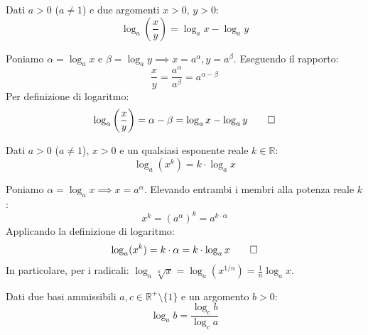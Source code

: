 \documentclass[11pt,a4paper,oneside]{report}
\begin{document}
\begin{teorema}
Dati $a > 0$ ($a \neq 1$) e due argomenti $x > 0$, $y > 0$:
\begin{equation}
    \log_a \left(\frac{x}{y}\right) = \log_a x - \log_a y
\end{equation}
\end{teorema}

\begin{dimostrazione}
Poniamo $\alpha = \log_a x$ e $\beta = \log_a y \implies x = a^\alpha, y = a^\beta$.
Eseguendo il rapporto:
\begin{equation}
    \frac{x}{y} = \frac{a^\alpha}{a^\beta} = a^{\alpha - \beta}
\end{equation}
Per definizione di logaritmo:
\begin{equation}
    \log_a \left(\frac{x}{y}\right) = \alpha - \beta = \log_a x - \log_a y \qedhere
\end{equation}
\end{dimostrazione}

\begin{teorema}
Dati $a > 0$ ($a \neq 1$), $x > 0$ e un qualsiasi esponente reale $k \in \mathbb{R}$:
\begin{equation}
    \log_a (x^k) = k \cdot \log_a x
\end{equation}
\end{teorema}

\begin{dimostrazione}
Poniamo $\alpha = \log_a x \implies x = a^\alpha$.
Elevando entrambi i membri alla potenza reale $k$:
\begin{equation}
    x^k = (a^\alpha)^k = a^{k \cdot \alpha}
\end{equation}
Applicando la definizione di logaritmo:
\begin{equation}
    \log_a (x^k) = k \cdot \alpha = k \cdot \log_a x \qedhere
\end{equation}
In particolare, per i radicali: $\log_a \sqrt[n]{x} = \log_a (x^{1/n}) = \frac{1}{n}\log_a x$.
\end{dimostrazione}

\begin{teorema}
Dati due basi ammissibili $a, c \in \mathbb{R}^+ \setminus \{1\}$ e un argomento $b > 0$:
\begin{equation}
    \log_a b = \frac{\log_c b}{\log_c a}
\end{equation}
\end{teorema}
\end{document}
